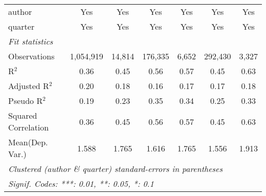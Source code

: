 \begin{tabular}{lcccccc}
   author                                                     & Yes            & Yes          & Yes           & Yes         & Yes            & Yes\\  
   quarter                                                    & Yes            & Yes          & Yes           & Yes         & Yes            & Yes\\  
   \midrule
   \emph{Fit statistics}\\
   Observations                                               & 1,054,919      & 14,814       & 176,335       & 6,652       & 292,430        & 3,327\\  
   R$^2$                                                      & 0.36           & 0.45         & 0.56          & 0.57        & 0.45           & 0.63\\  
   Adjusted R$^2$                                             & 0.20           & 0.18         & 0.16          & 0.17        & 0.17           & 0.18\\  
   Pseudo R$^2$                                               & 0.19           & 0.23         & 0.35          & 0.34        & 0.25           & 0.33\\  
   Squared Correlation                                        & 0.36           & 0.45         & 0.56          & 0.57        & 0.45           & 0.63\\  
Mean(Dep. Var.) & 1.588 & 1.765 & 1.616 & 1.765 & 1.556 & 1.913 \\
   \midrule \midrule
   \multicolumn{7}{l}{\emph{Clustered (author \& quarter) standard-errors in parentheses}}\\
   \multicolumn{7}{l}{\emph{Signif. Codes: ***: 0.01, **: 0.05, *: 0.1}}\\
\end{tabular}
\par\endgroup
